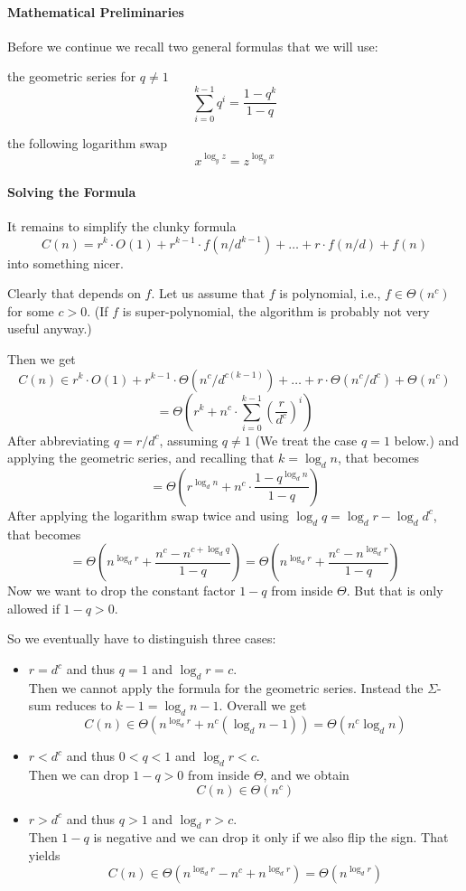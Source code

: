 \paragraph{Mathematical Preliminaries}
Before we continue we recall two general formulas that we will use:
\begin{compactitem}
 \item the geometric series for $q\neq 1$
  \[\sum_{i=0}^{k-1} q^i=\frac{1-q^k}{1-q}\]
 \item the following logarithm swap
  \[x^{\log_y z}=z^{\log_y x}\]
\end{compactitem}

\paragraph{Solving the Formula}
It remains to simplify the clunky formula
\[C(n)=r^k\cdot O(1) + r^{k-1}\cdot f(n/d^{k-1}) + \ldots + r\cdot f(n/d) + f(n)\]
into something nicer.

Clearly that depends on $f$.
Let us assume that $f$ is polynomial, i.e., $f\in\Theta(n^c)$ for some $c>0$.
(If $f$ is super-polynomial, the algorithm is probably not very useful anyway.)

Then we get
 \[C(n)\in r^k\cdot O(1) + r^{k-1}\cdot \Theta(n^c/d^{c(k-1)}) + \ldots + r\cdot \Theta(n^c/d^c) + \Theta(n^c)\]
 \[=\Theta\left(r^k + n^c\cdot \sum_{i=0}^{k-1}\left(\frac{r}{d^c}\right)^i\right)\] 
After abbreviating $q=r/d^c$, assuming $q\neq 1$ (We treat the case $q=1$ below.) and applying the geometric series, and recalling that $k=\log_d n$, that becomes
 \[=\Theta\left(r^{\log_d n} + n^c\cdot \frac{1-q^{\log_d n}}{1-q}\right)\]
After applying the logarithm swap twice and using $\log_d q=\log_d r - \log_d d^c$, that becomes
 \[=\Theta\left(n^{\log_d r} + \frac{n^c-n^{c+\log_d q}}{1-q}\right)=\Theta\left(n^{\log_d r} + \frac{n^c-n^{\log_d r}}{1-q}\right)\]
Now we want to drop the constant factor $1-q$ from inside $\Theta$.
But that is only allowed if $1-q>0$.

So we eventually have to distinguish three cases:
\begin{itemize}
\item $r=d^c$ and thus $q=1$ and $\log_d r=c$.\\
Then we cannot apply the formula for the geometric series.
Instead the $\Sigma$-sum reduces to $k-1=\log_d n -1$.
Overall we get
\[C(n)\in\Theta\left(n^{\log_d r} + n^c(\log_d n - 1)\right)=\Theta(n^c\log_d n)\]
\item $r<d^c$ and thus $0<q<1$ and $\log_d r < c$.\\
Then we can drop $1-q>0$ from inside $\Theta$, and we obtain
\[C(n)\in \Theta(n^c)\]
\item $r>d^c$ and thus $q>1$ and $\log_d r > c$.\\
 Then $1-q$ is negative and we can drop it only if we also flip the sign. That yields
 \[C(n) \in \Theta\left(n^{\log_d r}-n^c+n^{\log_d r}\right)=\Theta\left(n^{\log_d r}\right)\]
\end{itemize}

